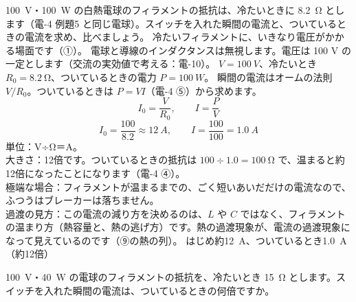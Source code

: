 \label{ph:電-9:ex9}
\begin{phreidai}[電球の突入電流]
\qty{100}{V}・\qty{100}{W} の白熱電球のフィラメントの抵抗は、冷たいときに \qty{8.2}{\ohm} とします（電-4 例題5 と同じ電球）。スイッチを入れた瞬間の電流と、ついているときの電流を求め、比べましょう。
\phbamen
冷たいフィラメントに、いきなり電圧がかかる場面です（①）。
\phmushi
電球と導線のインダクタンスは無視します。電圧は 100 V の一定とします（交流の実効値で考える：電-10）。
\phzu
$V=\qty{100}{V}$、冷たいとき $R_0=\qty{8.2}{\ohm}$、ついているときの電力 $P=\qty{100}{W}$。
\phriyu
瞬間の電流はオームの法則 $V/R_0$。ついているときは $P=VI$（電-4 ⑤）から求めます。
\phtateru
\[ I_0=\frac{V}{R_0},\qquad I=\frac{P}{V} \]
\phtoku
\[ I_0=\frac{100}{8.2}\approx\qty{12}{A},\qquad I=\frac{100}{100}=\qty{1.0}{A} \]
\phtashikame
単位：V÷Ω＝A。\\
大きさ：12倍です。ついているときの抵抗は $100\div1.0=\qty{100}{\ohm}$ で、温まると約12倍になったことになります（電-4 ④）。\\
極端な場合：フィラメントが温まるまでの、ごく短いあいだだけの電流なので、ふつうはブレーカーは落ちません。\\
過渡の見方：この電流の減り方を決めるのは、$L$ や $C$ ではなく、フィラメントの温まり方（熱容量と、熱の逃げ方）です。熱の過渡現象が、電流の過渡現象になって見えているのです（⑨の熱の列）。
\kotae はじめ約\qty{12}{A}、ついているとき\qty{1.0}{A}（約12倍）
\end{phreidai}
\begin{jibun}
\qty{100}{V}・\qty{40}{W} の電球のフィラメントの抵抗を、冷たいとき \qty{15}{\ohm} とします。スイッチを入れた瞬間の電流は、ついているときの何倍ですか。
\end{jibun}

